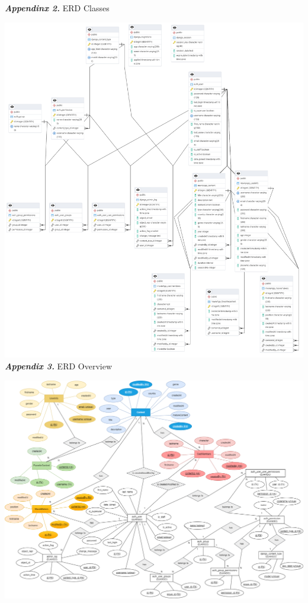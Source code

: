 \documentclass[letterpaper,twocolumn]{article}
\newcommand{\myparagraph}[1]{\vspace{0.1cm}\noindent \textbf{\textit{#1.}}}
\begin{document}
\clearpage
\myparagraph{Appendinx 2} ERD Classes

\includegraphics[scale=0.24]{images/ERDNewUpdated.png}\\[0.1cm] 

\clearpage
\myparagraph{Appendix 3} ERD Overview
\vspace{2ex}


\includegraphics[scale=0.30]{images/WebTechERDNewUpdated.drawio.png}\\[0.1cm] 
\end{document}
